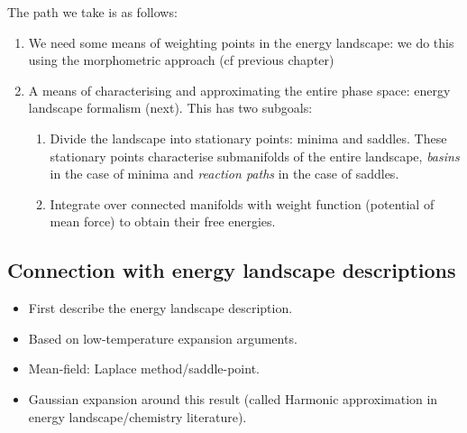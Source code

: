 \documentclass[11pt,twoside]{report}
\begin{document}
The path we take is as follows:
\begin{enumerate}
\item We need some means of weighting points in the energy landscape: we do this using the morphometric approach (cf previous chapter)
\item A means of characterising and approximating the entire phase space: energy landscape formalism (next). This has two subgoals:
  \begin{enumerate}
  \item Divide the landscape into stationary points: minima and saddles.
    These stationary points characterise submanifolds of the entire landscape, \emph{basins} in the case of minima and \emph{reaction paths} in the case of saddles.
  \item Integrate over connected manifolds with weight function (potential of mean force) to obtain their free energies.
  \end{enumerate}
\end{enumerate}


\subsection{Connection with energy landscape descriptions}

\begin{itemize}
  \item First describe the energy landscape description.
  \item Based on low-temperature expansion arguments.
  \item Mean-field: Laplace method/saddle-point.
  \item Gaussian expansion around this result (called Harmonic approximation in energy landscape/chemistry literature).
\end{itemize}
\end{document}
